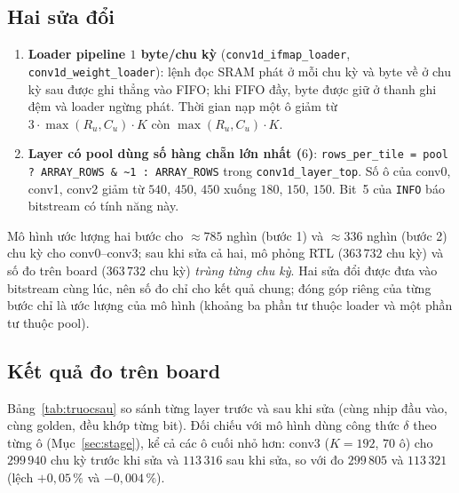 \subsection{Hai sửa đổi}
\sloppy
\begin{enumerate}
  \item \textbf{Loader pipeline $1$ byte/chu kỳ} (\texttt{conv1d\_ifmap\_loader}, \texttt{conv1d\_weight\_loader}): lệnh đọc SRAM phát ở mỗi chu kỳ và byte về ở chu kỳ sau được ghi thẳng vào FIFO; khi FIFO đầy, byte được giữ ở thanh ghi đệm và loader ngừng phát.
  Thời gian nạp một ô giảm từ $3\cdot\max(R_u,C_u)\cdot K$ còn $\max(R_u,C_u)\cdot K$.
  \item \textbf{Layer có pool dùng số hàng chẵn lớn nhất ($6$)}: \texttt{rows\_per\_tile = pool ? ARRAY\_ROWS \& \textasciitilde1 : ARRAY\_ROWS} trong \texttt{conv1d\_layer\_top}.
  Số ô của conv0, conv1, conv2 giảm từ $540$, $450$, $450$ xuống $180$, $150$, $150$.
  Bit~5 của \texttt{INFO} báo bitstream có tính năng này.
\end{enumerate}
\fussy
Mô hình ước lượng hai bước cho $\approx785$ nghìn (bước 1) và $\approx336$ nghìn (bước 2) chu kỳ cho conv0--conv3; sau khi sửa cả hai, mô phỏng RTL ($363\,732$ chu kỳ) và số đo trên board ($363\,732$ chu kỳ) \emph{trùng từng chu kỳ}.
Hai sửa đổi được đưa vào bitstream cùng lúc, nên số đo chỉ cho kết quả chung; đóng góp riêng của từng bước chỉ là ước lượng của mô hình (khoảng ba phần tư thuộc loader và một phần tư thuộc pool).

\subsection{Kết quả đo trên board}
Bảng~\ref{tab:truocsau} so sánh từng layer trước và sau khi sửa (cùng nhịp đầu vào, cùng golden, đều khớp từng bit).
Đối chiếu với mô hình dùng công thức $\delta$ theo từng ô (Mục~\ref{sec:stage}), kể cả các ô cuối nhỏ hơn: conv3 ($K=192$, $70$ ô) cho $299\,940$ chu kỳ trước khi sửa và $113\,316$ sau khi sửa, so với đo $299\,805$ và $113\,321$ (lệch $+0{,}05\,\%$ và $-0{,}004\,\%$).

